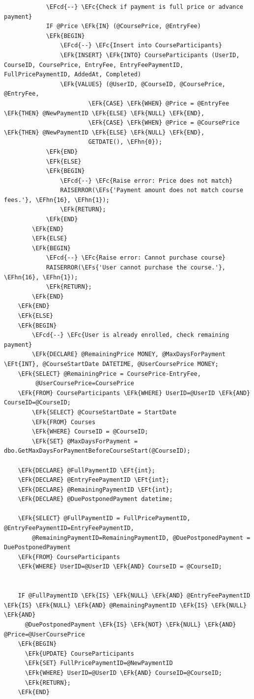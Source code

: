 \documentclass[11pt]{article}
\newcommand{\EFc}[1]{\textcolor{EFc}{\textit{#1}}} %
\newcommand{\EFcd}[1]{\textcolor{EFcd}{\textit{#1}}} %
\newcommand{\EFs}[1]{\textcolor{EFs}{#1}} %
\newcommand{\EFk}[1]{\textcolor{EFk}{\textbf{#1}}} %
\newcommand{\EFt}[1]{\textcolor{EFt}{\textbf{#1}}} %
\newcommand{\EFhn}[1]{\textcolor{EFhn}{#1}} %
\begin{document}
\begin{Code}
\begin{Verbatim}
            \EFcd{--} \EFc{Check if payment is full price or advance payment}
            IF @Price \EFk{IN} (@CoursePrice, @EntryFee)
            \EFk{BEGIN}
                \EFcd{--} \EFc{Insert into CourseParticipants}
                \EFk{INSERT} \EFk{INTO} CourseParticipants (UserID, CourseID, CoursePrice, EntryFee, EntryFeePaymentID, FullPricePaymentID, AddedAt, Completed)
                \EFk{VALUES} (@UserID, @CourseID, @CoursePrice, @EntryFee, 
                        \EFk{CASE} \EFk{WHEN} @Price = @EntryFee \EFk{THEN} @NewPaymentID \EFk{ELSE} \EFk{NULL} \EFk{END},
                        \EFk{CASE} \EFk{WHEN} @Price = @CoursePrice \EFk{THEN} @NewPaymentID \EFk{ELSE} \EFk{NULL} \EFk{END},
                        GETDATE(), \EFhn{0});
            \EFk{END}
            \EFk{ELSE}
            \EFk{BEGIN}
                \EFcd{--} \EFc{Raise error: Price does not match}
                RAISERROR(\EFs{'Payment amount does not match course fees.'}, \EFhn{16}, \EFhn{1});
                \EFk{RETURN};
            \EFk{END}
        \EFk{END}
        \EFk{ELSE}
        \EFk{BEGIN}
            \EFcd{--} \EFc{Raise error: Cannot purchase course}
            RAISERROR(\EFs{'User cannot purchase the course.'}, \EFhn{16}, \EFhn{1});
            \EFk{RETURN};
        \EFk{END}
    \EFk{END}
    \EFk{ELSE}
    \EFk{BEGIN}
        \EFcd{--} \EFc{User is already enrolled, check remaining payment}
        \EFk{DECLARE} @RemainingPrice MONEY, @MaxDaysForPayment \EFt{INT}, @CourseStartDate DATETIME, @UserCoursePrice MONEY;
    \EFk{SELECT} @RemainingPrice = CoursePrice-EntryFee,
         @UserCoursePrice=CoursePrice
    \EFk{FROM} CourseParticipants \EFk{WHERE} UserID=@UserID \EFk{AND} CourseID=@CourseID;
        \EFk{SELECT} @CourseStartDate = StartDate 
        \EFk{FROM} Courses 
        \EFk{WHERE} CourseID = @CourseID;
        \EFk{SET} @MaxDaysForPayment = dbo.GetMaxDaysForPaymentBeforeCourseStart(@CourseID);

    \EFk{DECLARE} @FullPaymentID \EFt{int};
    \EFk{DECLARE} @EntryFeePaymentID \EFt{int};
    \EFk{DECLARE} @RemainingPaymentID \EFt{int};
    \EFk{DECLARE} @DuePostponedPayment datetime;

    \EFk{SELECT} @FullPaymentID = FullPricePaymentID, @EntryFeePaymentID=EntryFeePaymentID,
        @RemainingPaymentID=RemainingPaymentID, @DuePostponedPayment = DuePostponedPayment
    \EFk{FROM} CourseParticipants
    \EFk{WHERE} UserID=@UserID \EFk{AND} CourseID = @CourseID;


    IF @FullPaymentID \EFk{IS} \EFk{NULL} \EFk{AND} @EntryFeePaymentID \EFk{IS} \EFk{NULL} \EFk{AND} @RemainingPaymentID \EFk{IS} \EFk{NULL} \EFk{AND} 
      @DuePostponedPayment \EFk{IS} \EFk{NOT} \EFk{NULL} \EFk{AND} @Price=@UserCoursePrice
    \EFk{BEGIN}
      \EFk{UPDATE} CourseParticipants
      \EFk{SET} FullPricePaymentID=@NewPaymentID
      \EFk{WHERE} UserID=@UserID \EFk{AND} CourseID=@CourseID;
      \EFk{RETURN};
    \EFk{END}



\end{Verbatim}
\end{Code}
\end{document}
